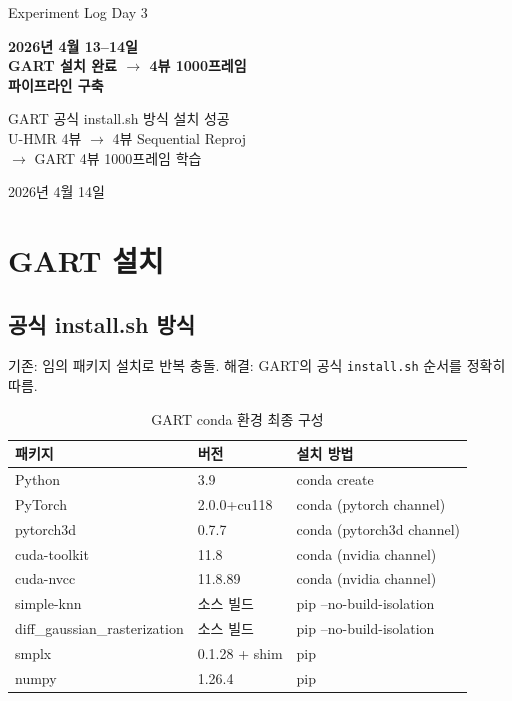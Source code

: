 \documentclass[11pt, a4paper]{report}
\begin{document}
\begin{titlepage}
\centering
\vspace*{1.5cm}
{\Large\color{gray} Experiment Log Day 3}
\vspace{0.5cm}

{\Huge\bfseries\color{defblue} 2026년 4월 13--14일\\[0.3cm]
GART 설치 완료 $\rightarrow$ 4뷰 1000프레임\\[0.3cm]
파이프라인 구축}

\vspace{1cm}

{\LARGE\color{defblue!70!black} GART 공식 install.sh 방식 설치 성공\\
U-HMR 4뷰 $\rightarrow$ 4뷰 Sequential Reproj\\
$\rightarrow$ GART 4뷰 1000프레임 학습}

\vspace{2cm}
{\large 2026년 4월 14일}
\end{titlepage}

\tableofcontents
\newpage


\chapter{GART 설치}

\section{공식 install.sh 방식}

기존: 임의 패키지 설치로 반복 충돌. 해결: GART의 공식 \texttt{install.sh} 순서를 정확히 따름.

\begin{table}[H]
\centering
\caption{GART conda 환경 최종 구성}
\renewcommand{\arraystretch}{1.3}
\begin{tabular}{l l l}
\toprule
\textbf{패키지} & \textbf{버전} & \textbf{설치 방법} \\
\midrule
Python & 3.9 & conda create \\
PyTorch & 2.0.0+cu118 & conda (pytorch channel) \\
pytorch3d & 0.7.7 & conda (pytorch3d channel) \\
cuda-toolkit & 11.8 & conda (nvidia channel) \\
cuda-nvcc & 11.8.89 & conda (nvidia channel) \\
simple-knn & 소스 빌드 & pip --no-build-isolation \\
diff\_gaussian\_rasterization & 소스 빌드 & pip --no-build-isolation \\
smplx & 0.1.28 + shim & pip \\
numpy & 1.26.4 & pip \\
\bottomrule
\end{tabular}
\end{table}
\end{document}
